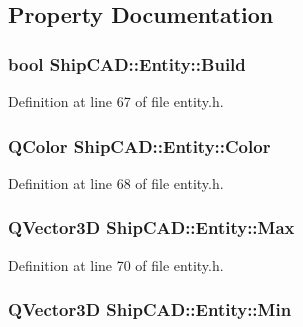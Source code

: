 \subsection{Property Documentation}
\hypertarget{classShipCAD_1_1Entity_a7518cde7c6a7c576827efd3d65c732e4}{
\subsubsection[{Build}]{\setlength{\rightskip}{0pt plus 5cm}bool Ship\-C\-A\-D\-::\-Entity\-::\-Build\hspace{0.3cm}{\ttfamily [read]}}}\label{classShipCAD_1_1Entity_a7518cde7c6a7c576827efd3d65c732e4}


Definition at line 67 of file entity.\-h.

\hypertarget{classShipCAD_1_1Entity_a117b8362d17e9ef352555a85a6f015ff}{
\subsubsection[{Color}]{\setlength{\rightskip}{0pt plus 5cm}Q\-Color Ship\-C\-A\-D\-::\-Entity\-::\-Color}}\label{classShipCAD_1_1Entity_a117b8362d17e9ef352555a85a6f015ff}


Definition at line 68 of file entity.\-h.

\hypertarget{classShipCAD_1_1Entity_a1ce317d1da352757209465baebce15f8}{
\subsubsection[{Max}]{\setlength{\rightskip}{0pt plus 5cm}Q\-Vector3\-D Ship\-C\-A\-D\-::\-Entity\-::\-Max\hspace{0.3cm}{\ttfamily [read]}}}\label{classShipCAD_1_1Entity_a1ce317d1da352757209465baebce15f8}


Definition at line 70 of file entity.\-h.

\hypertarget{classShipCAD_1_1Entity_ac363c3a8e4d5553b98996d6114b6b148}{
\subsubsection[{Min}]{\setlength{\rightskip}{0pt plus 5cm}Q\-Vector3\-D Ship\-C\-A\-D\-::\-Entity\-::\-Min\hspace{0.3cm}{\ttfamily [read]}}}\label{classShipCAD_1_1Entity_ac363c3a8e4d5553b98996d6114b6b148}


